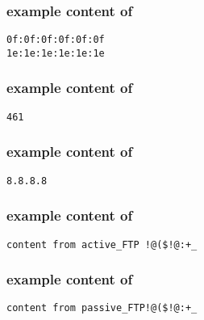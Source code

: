 \hypertarget{macformat}{}
\subsubsection*{example content of \texttt{\hyperlink{cp1macip}{\filemac}}}
\begin{mdframed}
\begin{Verbatim}
0f:0f:0f:0f:0f:0f
1e:1e:1e:1e:1e:1e
\end{Verbatim}
\end{mdframed}

\hypertarget{tcpformat}{}
\subsubsection*{example content of \texttt{\hyperlink{cp1tcp}{\filetcp}}}
\begin{mdframed}
\begin{Verbatim}
461
\end{Verbatim}
\end{mdframed}

\hypertarget{gwformat}{}
\subsubsection*{example content of \texttt{\hyperlink{cp1gw}{\filegw}}}
\begin{mdframed}
\begin{Verbatim}
8.8.8.8
\end{Verbatim}
\end{mdframed}

\hypertarget{activeformat}{}
\subsubsection*{example content of \texttt{\hyperlink{cp1ftp}{\fileactive}}}
\begin{mdframed}
\begin{Verbatim}
content from active_FTP !@($!@:+_
\end{Verbatim}
\end{mdframed}

\pagebreak

\hypertarget{passiveformat}{}
\subsubsection*{example content of \texttt{\hyperlink{cp1ftp}{\filepassive}}}
\begin{mdframed}
\begin{Verbatim}
content from passive_FTP!@($!@:+_
\end{Verbatim}
\end{mdframed}

